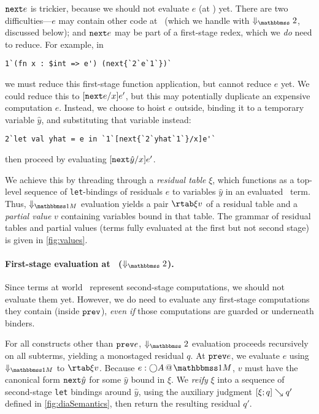 \begin{abstrsyn}
${\tt next}{e}$ is trickier, because we should not evaluate $e$ (at \bbtwo) yet.
There are two difficulties---$e$ may contain other code at \bbonem\ (which we
handle with $\redtwosym$, discussed below); and ${\tt next}{e}$ may be part of a
first-stage redex, which we \emph{do} need to reduce. For example, in
\begin{lstlisting} 
1`(fn x : $int => e') (next{`2`e`1`})`
\end{lstlisting}
we must reduce this first-stage function application, but cannot reduce $e$ yet.
We could reduce this to $[{\tt next}{e}/x]e'$, but this may potentially duplicate an
expensive computation $e$. Instead, we choose to hoist $e$ outside, binding it
to a temporary variable $\hat{y}$, and substituting that variable instead:
\begin{lstlisting} 
2`let val yhat = e in `1`[next{`2`yhat`1`}/x]e'`
\end{lstlisting}
then proceed by evaluating $[{\tt next}{\hat{y}}/x]e'$.

We achieve this by threading through a \emph{residual table} $\xi$, which
functions as a top-level sequence of \texttt{let}-bindings of residuals $e$ to
variables $\hat{y}$ in an evaluated \bbonem\ term. Thus, $\redonesym$ evaluation
yields a pair $\rtab \xi v$ of a residual table and a \emph{partial value} $v$
containing variables bound in that table. The grammar of residual tables and
partial values (terms fully evaluated at the first but not second stage) is
given in \ref{fig:values}.


\paragraph{First-stage evaluation at \bbtwo\ ($\redtwosym$).}
Since terms at world \bbtwo\ represent second-stage computations, we should not
evaluate them yet. However, we do need to evaluate any first-stage computations
they contain (inside ${\tt prev}$), \emph{even if} those computations are guarded or
underneath binders.

For all constructs other than ${\tt prev}{e}$, $\redtwosym$ evaluation proceeds
recursively on all subterms, yielding a monostaged residual $q$. At ${\tt prev}{e}$,
we evaluate $e$ using $\redonesym$ to $\rtab \xi v$. Because $\colmix e{\fut A}$,
$v$ must have the canonical form ${\tt next}{\hat{y}}$ for some $\hat{y}$ bound in $\xi$. We \emph{reify}
$\xi$ into a sequence of second-stage \texttt{let} bindings around $\hat{y}$,
using the auxiliary judgment $[{\xi};{q}]\searrow{q'}$ defined in
\ref{fig:diaSemantics}, then return the resulting residual $q'$.

\end{abstrsyn}

